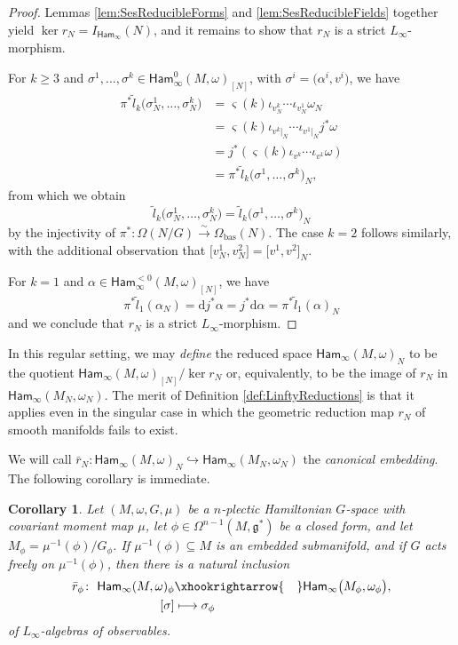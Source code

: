 \documentclass[10pt,a4paper]{amsart}
\numberwithin{equation}{section}
\newtheorem{Corollary}[Theorem]{Corollary}
\newcommand{\g}{\mathfrak{g}}
\newcommand{\Ham}{\mathsf{Ham}}
\renewcommand{\subset}{\subseteq}
\renewcommand{\d}{\mathrm{d}}
\begin{document}
\begin{proof}
	Lemmas \ref{lem:SesReducibleForms} and \ref{lem:SesReducibleFields} together yield $\ker r_N=I_{\Ham_\infty}(N)$, and it remains to show that $r_N$ is a strict $L_\infty$-morphism.

	For $k\geq 3$ and $\sigma^1,\dots,\sigma^k \in \Ham_\infty^0(M,\omega)_{[N]}$, with $\sigma^i=\bigl(\alpha^i,v^i\bigr)$, we have
	\begin{align*}
		\pi^* \tilde{l}_k\bigl(\sigma_N^1,\dots,\sigma_N^k\bigr)
			&=	\varsigma(k)  \iota_{v_N^k}\cdots\iota_{v_N^1} \omega_N		\\
		&=	\varsigma(k)  \iota_{v^k|_N}\cdots\iota_{v^1|_N} j^*\omega		\\
		&=	j^*(\varsigma(k)  \iota_{v^k}\cdots\iota_{v^1}\omega)		\\
		&=	\pi^* \tilde{l}_k\bigl(\sigma^1,\dots,\sigma^k\bigr)_N,
	\end{align*}
	from which we obtain
	\[
		\tilde{l}_k\bigl(\sigma_N^1,\dots,\sigma_N^k\bigr) = \tilde{l}_k\bigl(\sigma^1,\dots,\sigma^k\bigr)_N
	\]
	by the injectivity of $\pi^*\colon \Omega(N/G)\xrightarrow{\sim}\Omega_{\mathrm{bas}}(N)$. The case $k=2$ follows similarly, with the additional observation that $\bigl[v_N^1,v_N^2\bigr] = \bigl[v^1,v^2\bigr]_N$.

	For $k=1$ and $\alpha\in\Ham_\infty^{<0}(M,\omega)_{[N]}$, we have
	\[
		\pi^*\tilde{l}_1(\alpha_N) = \d j^*\alpha = j^*\d\alpha = \pi^*\tilde{l}_1(\alpha)_N
	\]
	and we conclude that $r_N$ is a strict $L_\infty$-morphism.
\end{proof}

\begin{Remark}
	In this regular setting, we may \emph{define} the reduced space $\Ham_\infty(M,\omega)_N$ to be the quotient $\Ham_\infty(M,\omega)_{[N]} / \ker r_N$ or, equivalently, to be the image of $r_N$ in $\Ham_\infty(M_N,\omega_N)$. The merit of Definition \ref{def:LinftyReductions} is that it applies even in the singular case in which the geometric reduction map $r_N$ of smooth manifolds fails to exist.
\end{Remark}

We will call $\bar{r}_N\colon \Ham_\infty(M,\omega)_N \hookrightarrow \Ham_\infty(M_N,\omega_N)$ the \emph{canonical embedding}. The following corollary is immediate.

\begin{Corollary}
	Let $(M,\omega,G,\mu)$ be a $n$-plectic Hamiltonian $G$-space with covariant moment map $\mu$, let $\phi\in\Omega^{n-1}(M,\g^*)$ be a closed form, and let $M_\phi= \mu^{-1}(\phi)/G_\phi$. If $\mu^{-1}(\phi)\subset M$ is an embedded submanifold, and if $G$ acts freely on $\mu^{-1}(\phi)$, then there is a natural inclusion
	\begin{align*}
		\bar{r}_\phi\colon \	\Ham_\infty(M,\omega)_\phi	&\xhookrightarrow{\hspace{10pt}}	\Ham_\infty\bigl(M_\phi,\omega_\phi\bigr),	\\
				[\sigma]		&\longmapsto				\sigma_\phi
	\end{align*}
	of $L_\infty$-algebras of observables.
\end{Corollary}
\end{document}
